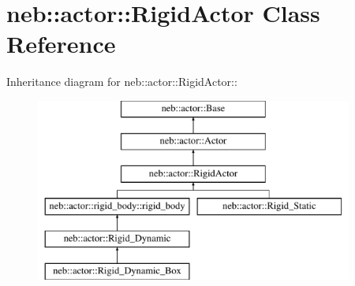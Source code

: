 \hypertarget{classneb_1_1actor_1_1RigidActor}{
\section{neb::actor::RigidActor Class Reference}
\label{classneb_1_1actor_1_1RigidActor}
}
Inheritance diagram for neb::actor::RigidActor::\begin{figure}[H]
\begin{center}
\leavevmode
\includegraphics[height=6cm]{classneb_1_1actor_1_1RigidActor}
\end{center}
\end{figure}
